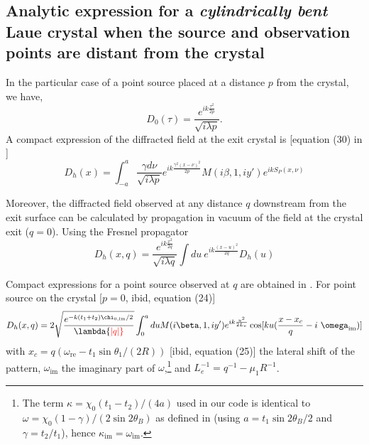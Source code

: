 \documentclass[preprint]{iucr}              %
\newcommand{\inred}[1]{{\color{red}#1}}
\begin{document}
%
\subsection{Analytic expression for a \textit{cylindrically bent} Laue crystal when the source and observation points are distant from the crystal}
\label{sec:distantpandq}

In the particular case of a point source placed at a distance $p$ from the crystal,  we have,
\begin{equation}\label{eq:pointsource}
D_0(\tau)= \frac{e^{ik\frac{\tau^2}{2p}}}{\sqrt{i \lambda p}}.
\end{equation}
A compact expression of the diffracted field at the exit crystal is [equation (30) in \cite{GuigayFerrero2016}]
\begin{equation}\label{eq:anypandq0}
    D_h(x) = \int_{-a}^{a} 
    \frac{\gamma d\nu}{\sqrt{i \lambda p}}
    e^{i k \frac{\gamma^2 (x-\nu)^2}{2 p}}
    M(i\beta, 1, i y')
    e^{i k S_P(x, \nu)}
\end{equation}

Moreover, the diffracted field observed at any distance $q$ downstream from the exit surface can be calculated by propagation in vacuum of the field at the crystal exit ($q=0$). Using the Fresnel propagator
\begin{equation}\label{eq:fresnel}
    D_h(x,q) = \frac{e^{i k \frac{x^2}{2 q}}}{\sqrt{i \lambda q}} \int du~e^{i k \frac{(x-u)^2}{2q}} D_h(u)
\end{equation}

Compact expressions for a point source observed at $q$ are obtained in \cite{GuigayFerrero2016}. 
For point source on the crystal [$p=0$, ibid, equation (24)] 
\begin{equation}\label{eq:p0anaanyq}
    D_h(x,q) = 2
    \sqrt{
    \frac{e^{-k (t_1 + t_2 ) \chi_{0,\text{im}} / 2}}{\lambda \inred{|q|}}}
    \int_{0}^a du M(i\beta,1,i y')
    e^{i k \frac{u^2}{2 L_e}}
    \cos[k u (\frac{x-x_c}{q} - i ~ \omega_\text{im} ) ]
\end{equation}
with
$x_c = q(\omega_\text{re} - t_1 \sin\theta_1 / (2R))$ [ibid, equation (25)] the lateral shift of the pattern,
$\omega_\text{im}$ the imaginary part of $\omega$,\footnote{The term $\kappa = \chi_0 (t_1 - t_2)/ (4 a)$ used in our code is identical to $\omega = \chi_0 (1-\gamma)/(2 \sin 2\theta_B)$ as defined in \cite{GuigayFerrero2016} (using $a = t_1 \sin 2\theta_B / 2$ and $\gamma=t_2/t_1$), hence $\kappa_\text{im}=\omega_\text{im}$.} and
$L_e^{-1}=q^{-1} - \mu_1  R^{-1}$.
\end{document}
